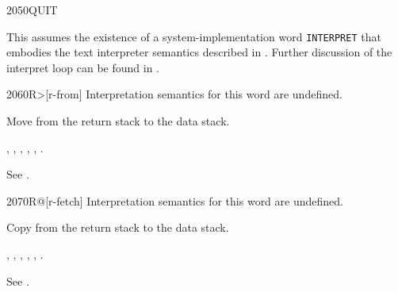 \begin{worddef}{2050}{QUIT}
\begin{implement}
		\dffamily
		This assumes the existence of a system-implementation word
		\texttt{INTERPRET} that embodies the text interpreter semantics
		described in .
		Further discussion of the interpret loop can be found in
		.
	\end{implement}
\end{worddef}

\vspace*{-2ex}
\begin{worddef}[Rfrom]{2060}{R>}[r-from]
\interpret
	Interpretation semantics for this word are undefined.

\execute

	Move  from the return stack to the data stack.

\see {},
	,
	,
	,
	,
	.

	\begin{testing} %
		See .
	\end{testing}
\end{worddef}

\vspace*{-2ex}
\enlargethispage{4ex}
\begin{worddef}{2070}{R@}[r-fetch]
\interpret
	Interpretation semantics for this word are undefined.

\execute

	Copy  from the return stack to the data stack.

\see {},
	,
	,
	,
	,
	.

	\begin{testing} %
		See .
	\end{testing}
\end{worddef}


